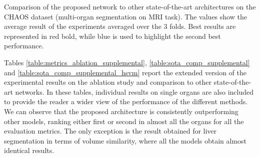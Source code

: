 \documentclass[journal]{IEEEtran}
\begin{document}
\begin{table*}[t!]
\caption{Comparison of the proposed network to other state-of-the-art architectures on the CHAOS dataset (multi-organ segmentation on MRI task). The values show the average result of the experiments averaged over the 3 folds. Best results are represented in red bold, while blue is used to highlight the second best performance.}
\label{table:sota_comp_supplemental}
\end{table*}

Tables \ref{table:metrics_ablation_supplemental}, \ref{table:sota_comp_supplemental} and \ref{table:sota_comp_supplemental_hsvm} report the extended version of the experimental results on the ablation study and comparison to other state-of-the-art networks. In these tables, individual results on single organs are also included to provide the reader a wider view of the performance of the different methods. We can observe that the proposed architecture is consistently outperforming other models, ranking either first or second in almost all the organs for all the evaluation metrics. The only exception is the result obtained for liver segmentation in terms of volume similarity, where all the models obtain almost identical results.


\end{document}

